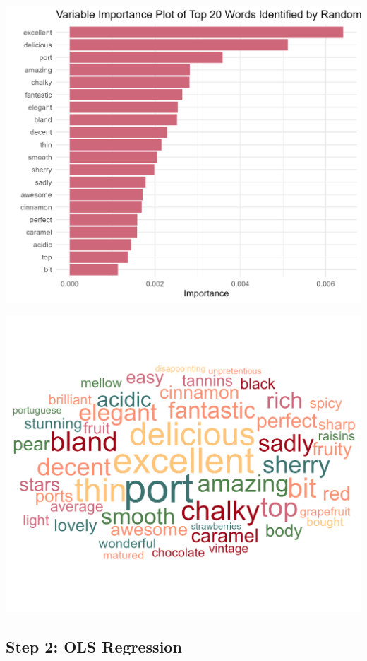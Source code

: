 \documentclass[11pt,preprint]{elsarticle}
\let\origfigure\figure
\let\endorigfigure\endfigure
\renewenvironment{figure}[1][2] {
    \expandafter\origfigure\expandafter[H]
} {
    \endorigfigure
}
\numberwithin{equation}{section}
\numberwithin{figure}{section}
\numberwithin{table}{section}
\begin{document}
\begin{figure}[H]

{\centering \includegraphics[width=0.8\linewidth]{writeup/fig5} 

}

\caption{Variable Importance Plot of Top 20 Words in Reviews Identified by Random Forest Model\label{fig:fig5}}\label{fig:fig5}
\end{figure}
\begin{figure}[H]

{\centering \includegraphics[width=0.8\linewidth]{writeup/fig6} 

}

\caption{Word cloud of top 50 words in reviews identified by Random Forest model\label{fig:fig6}}\label{fig:fig6}
\end{figure}

\subsection{Step 2: OLS Regression}\label{step-2-ols-regression}
\end{document}
